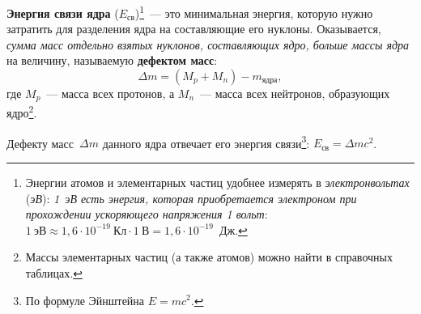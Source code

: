 \documentclass[main.tex]{subfiles}
\begin{document}
\textbf{Энергия связи ядра} ($E_\text{св}$)\footnote{Энергии атомов и элементарных частиц удобнее измерять в \emph{электронвольтах} (\emph{эВ}): \emph{1~эВ есть энергия, которая приобретается электроном при прохождении ускоряющего напряжения 1 вольт}: $1~\text{эВ}\approx1{,}6\cdot10^{-19}~\text{Кл}\cdot1~\text{В}= 1{,}6\cdot10^{-19}$~Дж.}~--- это минимальная энергия, которую нужно затратить для разделения ядра на составляющие его нуклоны. Оказывается, \emph{сумма масс отдельно взятых нуклонов, составляющих ядро, больше массы ядра} на величину, называемую \textbf{дефектом масс}:
\begin{equation}
    \Delta m=\left(M_p+M_n\right)-m_\text{ядра},
\end{equation}
где $M_p$~--- масса всех протонов, а $M_n$~--- масса всех нейтронов, образующих ядро\footnote{Массы элементарных частиц (а также атомов) можно найти в справочных таблицах.}.

Дефекту масс~$\Delta m$ данного ядра отвечает его энергия связи\footnote{По формуле Эйнштейна $E=mc^2$.}: $E_\text{св}=\Delta mc^2$.




 
\end{document}
